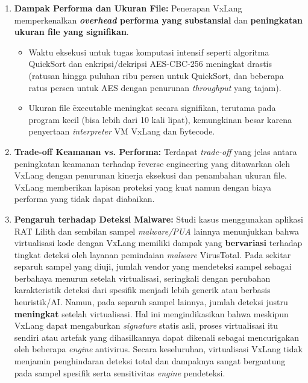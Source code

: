 \begin{enumerate}
    \item \textbf{Dampak Performa dan Ukuran File:} Penerapan VxLang memperkenalkan \textbf{\textit{overhead} performa yang substansial} dan \textbf{peningkatan ukuran file yang signifikan}.
        \begin{itemize}
            \item Waktu eksekusi untuk tugas komputasi intensif seperti algoritma QuickSort dan enkripsi/dekripsi AES-CBC-256 meningkat drastis (ratusan hingga puluhan ribu persen untuk QuickSort, dan beberapa ratus persen untuk AES dengan penurunan \textit{throughput} yang tajam).
            \item Ukuran file \f{executable} meningkat secara signifikan, terutama pada program kecil (bisa lebih dari 10 kali lipat), kemungkinan besar karena penyertaan \textit{interpreter} VM VxLang dan \f{bytecode}.
        \end{itemize}

    \item \textbf{Trade-off Keamanan vs. Performa:} Terdapat \textit{trade-off} yang jelas antara peningkatan keamanan terhadap \f{reverse engineering} yang ditawarkan oleh VxLang dengan penurunan kinerja eksekusi dan penambahan ukuran file. VxLang memberikan lapisan proteksi yang kuat namun dengan biaya performa yang tidak dapat diabaikan.

    \item \textbf{Pengaruh terhadap Deteksi Malware:} Studi kasus menggunakan aplikasi RAT Lilith dan sembilan sampel \textit{malware/PUA} lainnya menunjukkan bahwa virtualisasi kode dengan VxLang memiliki dampak yang \textbf{bervariasi} terhadap tingkat deteksi oleh layanan pemindaian \textit{malware} VirusTotal. Pada sekitar separuh sampel yang diuji, jumlah vendor yang mendeteksi sampel sebagai berbahaya menurun setelah virtualisasi, seringkali dengan perubahan karakteristik deteksi dari spesifik menjadi lebih generik atau berbasis heuristik/AI. Namun, pada separuh sampel lainnya, jumlah deteksi justru \textbf{meningkat} setelah virtualisasi. Hal ini mengindikasikan bahwa meskipun VxLang dapat mengaburkan \textit{signature} statis asli, proses virtualisasi itu sendiri atau artefak yang dihasilkannya dapat dikenali sebagai mencurigakan oleh beberapa \textit{engine} antivirus. Secara keseluruhan, virtualisasi VxLang tidak menjamin penghindaran deteksi total dan dampaknya sangat bergantung pada sampel spesifik serta sensitivitas \textit{engine} pendeteksi.
\end{enumerate}


